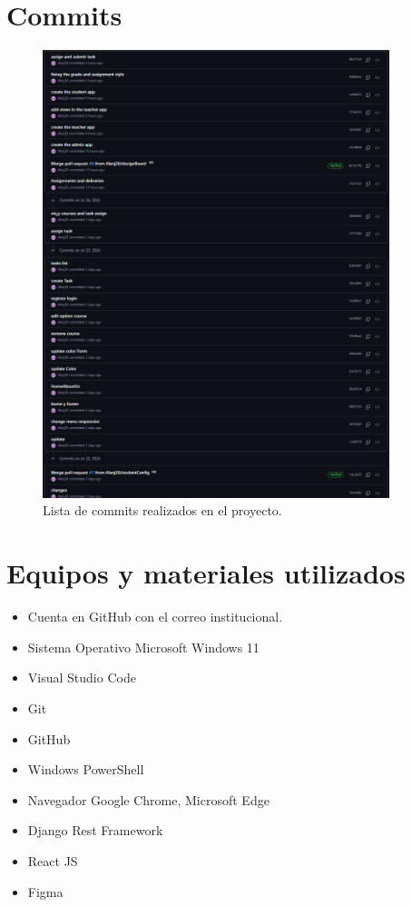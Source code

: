 \documentclass{article}
\begin{document}
\pagebreak
\section{Commits}
\begin{figure}[H]
	\centering
	\includegraphics[width=0.9\textwidth,keepaspectratio]{img/commits.png}
	\caption{Lista de commits realizados en el proyecto.}
\end{figure}
\pagebreak
\section{Equipos y materiales utilizados}
\begin{itemize}
	\item Cuenta en GitHub con el correo institucional.
	\item Sistema Operativo Microsoft Windows 11
	\item Visual Studio Code
	\item Git
	\item GitHub
	\item Windows PowerShell
	\item Navegador Google Chrome, Microsoft Edge
	\item Django Rest Framework
	\item React JS
	\item Figma
\end{itemize}
\pagebreak
\end{document}
